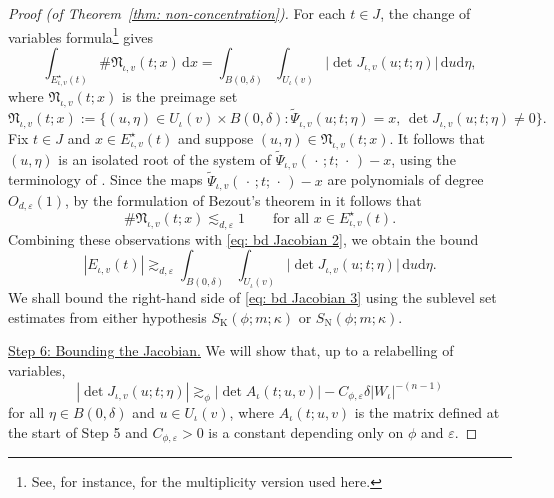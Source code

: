 \documentclass[reqno]{amsart}
\numberwithin{equation}{section}
\newcommand{\ud}{\mathrm{d}}
\newcommand{\fN}{\mathfrak{N}}
\theoremstyle{plain}
\theoremstyle{definition}
\newcommand{\tK}{\mathrm{K}}
\newcommand{\tN}{\mathrm{N}}
\begin{document}
\begin{proof}[Proof (of Theorem~\ref{thm: non-concentration})]
For each $t\in J$, the change of variables formula\footnote{See, for instance, \cite[Theorem 3.2.3]{Federer1969} for the multiplicity version used here.} gives
\begin{equation}\label{eq: bd Jacobian 2}
    \int_{E_{\iota, v}^{\star}(t)} \#\fN_{\iota, v}(t;x)\,\ud x = \int_{B(0,\delta)}\int_{U_{\iota}(v)} \big| \det J_{\iota, v}(u; t; \eta)\big|\,\ud u \ud \eta,
\end{equation}
where $\fN_{\iota, v}(t;x)$ is the preimage set
\begin{equation*}
   \fN_{\iota, v}(t;x) := \big\{(u, \eta) \in U_{\iota}(v) \times B(0,\delta) :  \widetilde{\Psi}_{\iota, v}(u;t;\eta) = x,\, \det J_{\iota, v}(u; t; \eta) \neq 0 \big\}.
\end{equation*}
Fix $t \in J$ and $x \in E_{\iota, v}^{\star}(t)$ and suppose $(u, \eta) \in \fN_{\iota, v}(t;x)$. It follows that $(u, \eta)$ is an isolated root of the system of $\widetilde{\Psi}_{\iota, v}(\,\cdot\,;t;\,\cdot\,) - x$, using the terminology of \cite[Definition 5.1]{CKW2010}. Since the maps $\widetilde{\Psi}_{\iota, v}(\,\cdot\,;t;\,\cdot\,) - x$ are polynomials of degree $O_{d, \varepsilon}(1)$, by the formulation of Bezout's theorem in \cite[Theorem 5.2]{CKW2010} it follows that 
\begin{equation*}
    \#\fN_{\iota, v}(t;x) \lesssim_{d, \varepsilon} 1 \qquad \textrm{for all $x \in E_{\iota, v}^{\star}(t)$.} 
\end{equation*}
Combining these observations with \eqref{eq: bd Jacobian 2}, we obtain the bound
\begin{equation}\label{eq: bd Jacobian 3}
    |E_{\iota, v}(t)| \gtrsim_{d, \varepsilon} \int_{B(0,\delta)}\int_{U_{\iota}(v)} \big| \det J_{\iota, v}(u; t; \eta)\big|\,\ud u \ud \eta.
\end{equation}
We shall bound the right-hand side of \eqref{eq: bd Jacobian 3} using the sublevel set estimates from either hypothesis $S_{\tK}(\phi;m;\kappa)$ or $S_{\tN}(\phi;m;\kappa)$.\medskip




\noindent \underline{Step 6: Bounding the Jacobian.} We will show that, up to a relabelling of variables, 
\begin{equation}\label{eq: step 6 bound}
|\det J_{\iota,v}(u;t;\eta)|\gtrsim_\phi |\det A_\iota(t;u,v)|-C_{\phi, \varepsilon}\delta|W_\iota|^{-(n-1)}
\end{equation}
for all $\eta\in B(0,\delta)$ and $u\in U_\iota(v)$, where $A_\iota(t;u,v)$ is the matrix defined at the start of Step 5 and $C_{\phi, \varepsilon} >0$ is a constant depending only on $\phi$ and $\varepsilon$.


\end{proof}
\end{document}
